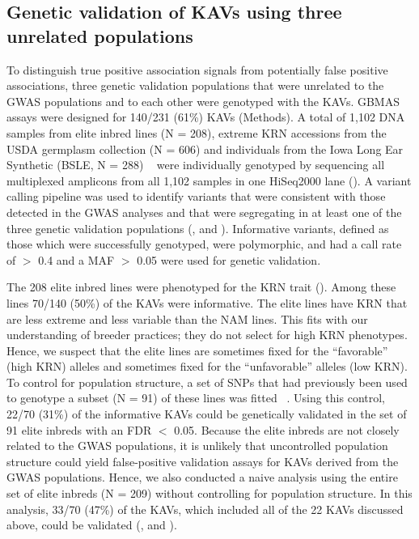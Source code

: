 \documentclass[10pt,letterpaper]{article}
\begin{document}
\subsection*{Genetic validation of KAVs using three unrelated populations}
To distinguish true positive association signals from potentially false positive associations, three genetic validation populations that were unrelated to the GWAS populations and to each other were genotyped with the KAVs. GBMAS assays were designed for 140/231 (61\%) KAVs (Methods). A total of 1,102 DNA samples from elite inbred lines (N = 208), extreme KRN accessions from the USDA germplasm collection (N = 606) and individuals from the Iowa Long Ear Synthetic (BSLE, N = 288) ~\cite{Hallauer2005} were individually genotyped by sequencing all multiplexed amplicons from all 1,102 samples in one HiSeq2000 lane (). A variant calling pipeline was used to identify variants that were consistent with those detected in the GWAS analyses and that were segregating in at least one of the three genetic validation populations (,  and ). Informative variants, defined as those which were successfully genotyped, were polymorphic, and had a call rate of  $>$ 0.4 and a MAF $>$ 0.05 were used for genetic validation.

The 208 elite inbred lines were phenotyped for the KRN trait (). Among these lines 70/140 (50\%) of the KAVs were informative. The elite lines have KRN that are less extreme and less variable than the NAM lines. This fits with our understanding of breeder practices; they do not select for high KRN phenotypes. Hence, we suspect that the elite lines are sometimes fixed for the “favorable” (high KRN) alleles and sometimes fixed for the “unfavorable” alleles (low KRN). To control for population structure, a set of SNPs that had previously been used to genotype a subset (N = 91) of these lines was fitted ~\cite{Nelson2008}. Using this control, 22/70 (31\%) of the informative KAVs could be genetically validated in the set of 91 elite inbreds with an FDR $<$ 0.05. Because the elite inbreds are not closely related to the GWAS populations, it is unlikely that uncontrolled population structure could yield false-positive validation assays for KAVs derived from the GWAS populations. Hence, we also conducted a naive analysis using the entire set of elite inbreds (N = 209) without controlling for population structure. In this analysis, 33/70 (47\%) of the KAVs, which included all of the 22 KAVs discussed above, could be validated (,  and ). 
\end{document}
